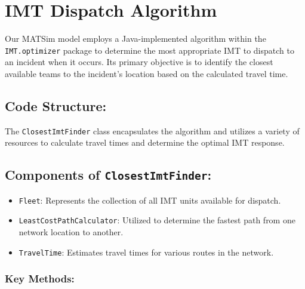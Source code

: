 \documentclass[fancy, oneside, mastersfancy, ms]{byuthesis}
\providecommand{\tightlist}{%
  \setlength{\itemsep}{0pt}\setlength{\parskip}{0pt}}\usepackage{longtable,booktabs,array}
\begin{document}
\hypertarget{imt-dispatch-algorithm}{%
\chapter{IMT Dispatch Algorithm}\label{imt-dispatch-algorithm}}

Our MATSim model employs a Java-implemented algorithm within the
\texttt{IMT.optimizer} package to determine the most appropriate IMT to
dispatch to an incident when it occurs. Its primary objective is to
identify the closest available teams to the incident's location based on
the calculated travel time.

\hypertarget{code-structure}{%
\section{Code Structure:}\label{code-structure}}

The \texttt{ClosestImtFinder} class encapsulates the algorithm and
utilizes a variety of resources to calculate travel times and determine
the optimal IMT response.

\hypertarget{components-of-closestimtfinder}{%
\section{\texorpdfstring{Components of
\texttt{ClosestImtFinder}:}{Components of ClosestImtFinder:}}\label{components-of-closestimtfinder}}

\begin{itemize}
\tightlist
\item
  \texttt{Fleet}: Represents the collection of all IMT units available
  for dispatch.
\item
  \texttt{LeastCostPathCalculator}: Utilized to determine the fastest
  path from one network location to another.
\item
  \texttt{TravelTime}: Estimates travel times for various routes in the
  network.
\end{itemize}

\hypertarget{key-methods}{%
\subsection{Key Methods:}\label{key-methods}}
\end{document}
